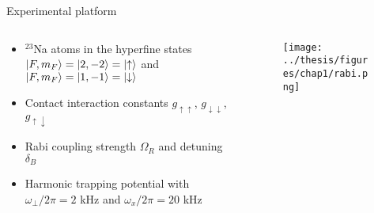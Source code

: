 \documentclass[aspectratio=169]{beamer}
\begin{document}

\begin{frame}{Experimental platform}
  \begin{columns}
    \begin{column}{0.5\textwidth}
      \begin{itemize}
        \item $^{23}$Na atoms in the hyperfine states $\ket{F,m_F} = \ket{2, -2} = \ket{\uparrow}$ and $\ket{F,m_F} = \ket{1, -1} = \ket{\downarrow}$
        \item Contact interaction constants $g_{\uparrow\uparrow}$, $g_{\downarrow\downarrow}$, $g_{\uparrow\downarrow}$
        \item Rabi coupling strength $\Omega_R$ and detuning $\delta_B$
        \item Harmonic trapping potential with $\omega_\perp/2\pi = 2$ \unit{\kilo\hertz} and $\omega_x/2\pi = 20$ \unit{\kilo\hertz}
      \end{itemize}
    \end{column}
    \begin{column}{0.5\textwidth}
      \begin{figure}
        \centering
        \texttt{[image: ../thesis/figures/chap1/rabi.png]}
      \end{figure}
    \end{column}
  \end{columns}
\end{frame}
\end{document}
